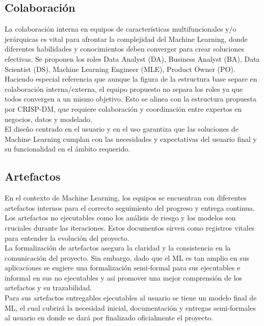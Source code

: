 \documentclass[journal]{IEEEtran}
\begin{document}
\subsection{Colaboración} \label{colaboracion}

La colaboración interna en equipos de características multifuncionales y/o jerárquicas es vital para afrontar la complejidad del Machine Learning, donde diferentes habilidades y conocimientos deben converger para crear soluciones efectivas. Se proponen los roles Data Analyst (DA), Business Analyst (BA), Data Scientist (DS), Machine Learning Engineer (MLE), Product Owner (PO). Haciendo especial referencia que aunque la figura de la estructura base \cite{Cret2013} separe en colaboración interna/externa, el equipo propuesto no separa los roles ya que todos convergen a un mismo objetivo. Esto se alinea con la estructura propuesta por CRISP-DM, que requiere colaboración y coordinación entre expertos en negocios, datos y modelado.\\

El diseño centrado en el usuario y en el uso garantiza que las soluciones de Machine Learning cumplan con las necesidades y expectativas del usuario final y su funcionalidad en el ámbito requerido.

\subsection{Artefactos}

En el contexto de Machine Learning, los equipos se encuentran con diferentes artefactos internos para el correcto seguimiento del progreso y entrega continua. Los artefactos no ejecutables como los análisis de riesgo y los modelos son cruciales durante las iteraciones. Estos documentos sirven como registros vitales para entender la evolución del proyecto.\\

La formalización de artefactos asegura la claridad y la consistencia en la comunicación del proyecto. Sin embargo, dado que el ML es tan amplio en sus aplicaciones se sugiere una formalización semi-formal para sus ejecutables e informal en sus no ejecutables y así promover una mejor comprensión de los artefactos y su trazabilidad.\\

Para sus artefactos entregables ejecutables al usuario se tiene un modelo final de ML, el cual cubrirá la necesidad inicial, documentación y entregas semi-formales al usuario en donde se dará por finalizado oficialmente el proyecto.
\end{document}

